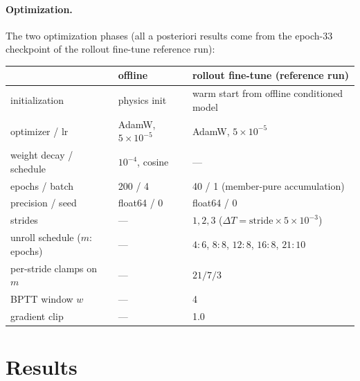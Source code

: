 \documentclass[11pt]{article}
\theoremstyle{plain}
\theoremstyle{definition}
\newcommand{\DT}{\Delta T}
\begin{document}
\paragraph{Optimization.}
The two optimization phases (all a posteriori results come from the
epoch-33 checkpoint of the rollout fine-tune reference run):
\begin{center}\small
\begin{tabular}{lll}
\toprule
 & offline & rollout fine-tune (reference run)\\
\midrule
initialization & physics init & warm start from offline conditioned model\\
optimizer / lr & AdamW, $5\times10^{-5}$ & AdamW, $5\times10^{-5}$\\
weight decay / schedule & $10^{-4}$, cosine & ---\\
epochs / batch & 200 / 4 & 40 / 1 (member-pure accumulation)\\
precision / seed & float64 / 0 & float64 / 0\\
strides & --- & $1,2,3$ ($\DT=\mathrm{stride}\times5\times10^{-3}$)\\
unroll schedule ($m{:}$epochs) & --- & $4{:}6$, $8{:}8$, $12{:}8$, $16{:}8$, $21{:}10$\\
per-stride clamps on $m$ & --- & $21/7/3$\\
BPTT window $w$ & --- & 4\\
gradient clip & --- & 1.0\\
\bottomrule
\end{tabular}
\end{center}

\section{Results}
\label{sec:results}
\end{document}
